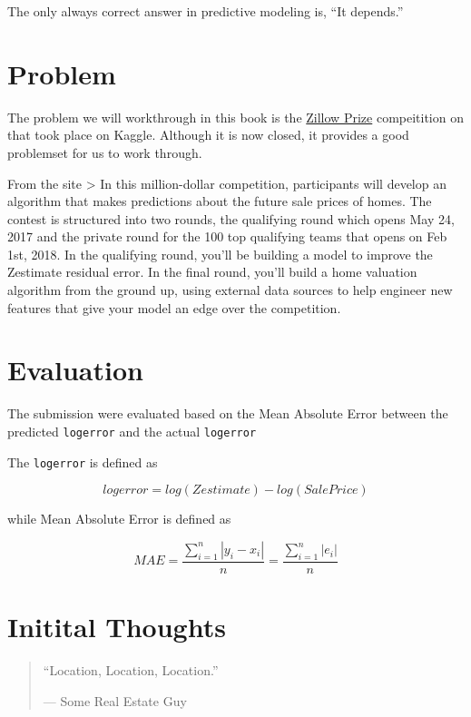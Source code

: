 \documentclass[]{book}
\theoremstyle{definition}
\theoremstyle{definition}
\theoremstyle{definition}
\theoremstyle{remark}
\begin{document}
The only always correct answer in predictive modeling is, ``It
depends.''

\section{Problem}\label{problem}

The problem we will workthrough in this book is the
\href{https://www.kaggle.com/c/zillow-prize-1}{Zillow Prize}
compeitition on that took place on Kaggle. Although it is now closed, it
provides a good problemset for us to work through.

From the site \textgreater{} In this million-dollar competition,
participants will develop an algorithm that makes predictions about the
future sale prices of homes. The contest is structured into two rounds,
the qualifying round which opens May 24, 2017 and the private round for
the 100 top qualifying teams that opens on Feb 1st, 2018. In the
qualifying round, you'll be building a model to improve the Zestimate
residual error. In the final round, you'll build a home valuation
algorithm from the ground up, using external data sources to help
engineer new features that give your model an edge over the competition.

\section{Evaluation}\label{evaluation}

The submission were evaluated based on the Mean Absolute Error between
the predicted \texttt{logerror} and the actual \texttt{logerror}

The \texttt{logerror} is defined as

\begin{equation}
logerror = log(Zestimate) - log(SalePrice)
\label{eq:logerror}
\end{equation}

while Mean Absolute Error is defined as

\begin{equation}
MAE = \frac{{\sum_{i=1}^{n} |y_i - x_i|}}{n} = \frac{{\sum_{i=1}^{n} |e_i|}}{n}
\label{eq:mae}
\end{equation}

\section{Initital Thoughts}\label{initital-thoughts}

\begin{quote}
``Location, Location, Location.''

--- Some Real Estate Guy
\end{quote}
\end{document}
